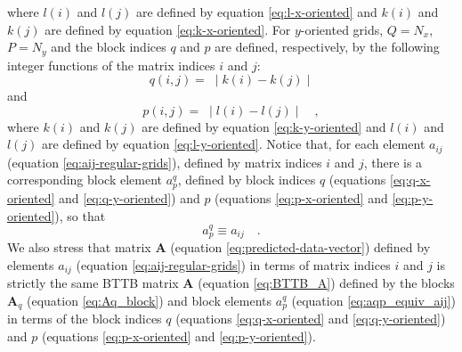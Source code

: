 where $l(i)$ and $l(j)$ are defined by equation \ref{eq:l-x-oriented} 
and $k(i)$ and $k(j)$ are defined by equation \ref{eq:k-x-oriented}.
For $y$-oriented grids, $Q = N_{x}$, $P = N_{y}$ and the block indices
$q$ and $p$ are defined, respectively, by the following integer functions 
of the matrix indices $i$ and $j$:
\begin{equation}
q(i, j) = \; \mid k(i) - k(j) \mid 
\label{eq:q-y-oriented}
\end{equation}
and
\begin{equation}
p(i, j) = \; \mid l(i) - l(j) \mid \quad ,
\label{eq:p-y-oriented}
\end{equation}
where $k(i)$ and $k(j)$ are defined by equation \ref{eq:k-y-oriented}
and $l(i)$ and $l(j)$ are defined by equation \ref{eq:l-y-oriented}.
Notice that, for each element $a_{ij}$ (equation \ref{eq:aij-regular-grids}),
defined by matrix indices $i$ and $j$, there is a corresponding block element
$a^{q}_{p}$, defined by block indices $q$ (equations \ref{eq:q-x-oriented} and 
\ref{eq:q-y-oriented}) and $p$ (equations \ref{eq:p-x-oriented} and \ref{eq:p-y-oriented}),
so that
\begin{equation}
	a^{q}_{p} \equiv a_{ij} \quad .
	\label{eq:aqp_equiv_aij}
\end{equation}
We also stress that matrix $\mathbf{A}$ (equation \ref{eq:predicted-data-vector}) defined 
by elements $a_{ij}$ (equation \ref{eq:aij-regular-grids}) in terms of matrix indices 
$i$ and $j$ is strictly the same BTTB matrix $\mathbf{A}$ (equation \ref{eq:BTTB_A}) defined 
by the blocks $\mathbf{A}_{q}$ (equation \ref{eq:Aq_block}) and block elements 
$a^{q}_{p}$ (equation \ref{eq:aqp_equiv_aij}) in terms of the block indices 
$q$ (equations \ref{eq:q-x-oriented} and \ref{eq:q-y-oriented}) and $p$ 
(equations \ref{eq:p-x-oriented} and \ref{eq:p-y-oriented}).

